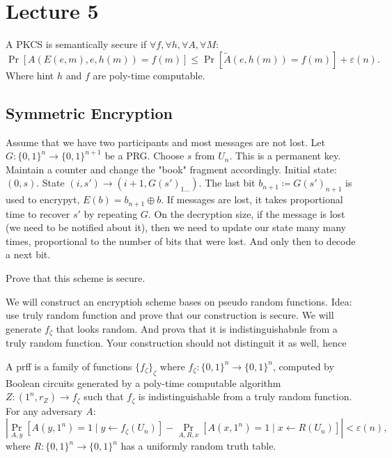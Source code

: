 
\section{Lecture 5}

\begin{definition}
	A PKCS is semantically secure if $\forall f, \forall h, \forall A, \forall M$:
	 \[
		 \Pr[A(E(e, m), e, h(m)) = f(m)] \le  \Pr[\tilde A(e, h(m)) = f(m)] + \varepsilon(n)
	.\] 
	Where hint $h$ and  $f$ are poly-time computable.

\end{definition}

\subsection{Symmetric Encryption}

Assume that we have two participants and most messages are not lost.
Let $G \colon \{0, 1\}^{n} \to  \{0, 1\}^{n + 1}$ be a PRG.
Choose $s$ from $U_n$.
This is a permanent key.
Maintain a counter and change the "book" fragment accordingly.
Initial state:  $(0, s)$.
State $(i, s') \to (i + 1, G(s')_{1\ldots })$.
The last bit $b_{n + 1} \coloneqq G(s')_{n + 1}$ is used to encrypyt, $E(b) = b_{n + 1} \oplus b$.
If messages are lost, it takes proportional time to recover $s'$ by repeating  $G$.
On the decryption size, if the message is lost (we need to be notified about it), then we need to update our state many many times, proportional to the number of bits that were lost.
And only then to decode a next bit.
 \begin{exercise}
	Prove that this scheme is secure.
\end{exercise}

We will construct an encryptioh scheme bases on pseudo random functions.
Idea: use truly random function and prove that our construction is secure.
We will generate $f_{\zeta}$ that looks random.
And prova that it is indistinguishabnle from a truly random function.
Your construction should not distinguit it as well, hence 

\begin{definition}
	A prff is a family of functions $\{f_{\zeta}\}_{\zeta} $ where $f_{\zeta}  \colon \{0, 1\}^{n}\to \{0, 1\}^{n}$, computed by Boolean circuits generated by a poly-time computable algorithm $Z  \colon (1^{n}, r_Z) \to  f_{\zeta}$ such that $f_{\zeta}$ is indistinguishable from a truly random function.
	For any adversary $A$:
	 \[
		 |\Pr_{A, y}[A(y, 1^{n}) = 1  \mid y \gets f_{\zeta}(U_n)] - \Pr_{A, R, x}[A(x, 1^{n}) = 1  \mid x \gets R(U_n)]| < \varepsilon(n),
	\] where $R \colon \{0, 1\}^{n} \to  \{0, 1\}^{n}$ has a uniformly random truth table.
\end{definition}

